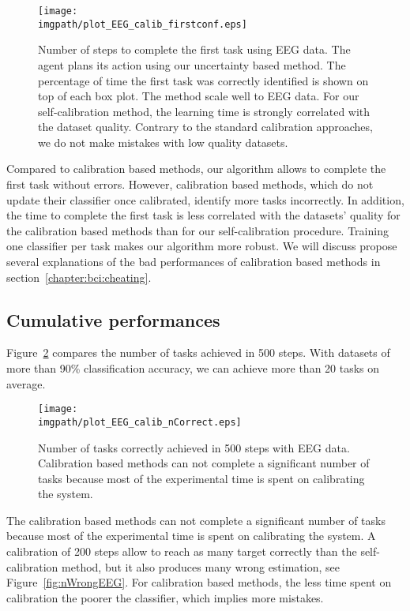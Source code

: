 \begin{figure}[!htbp]
\centering
\texttt{[image: \\imgpath/plot\_EEG\_calib\_firstconf.eps]}
\caption{Number of steps to complete the first task using EEG data. The agent plans its action using our uncertainty based method. The percentage of time the first task was correctly identified is shown on top of each box plot. The method scale well to EEG data. For our self-calibration method, the learning time is strongly correlated with the dataset quality. Contrary to the standard calibration approaches, we do not make mistakes with low quality datasets.}
\label{fig:firstEEG}
\end{figure}

Compared to calibration based methods, our algorithm allows to complete the first task without errors. However, calibration based methods, which do not update their classifier once calibrated, identify more tasks incorrectly. In addition, the time to complete the first task is less correlated with the datasets' quality for the calibration based methods than for our self-calibration procedure. Training one classifier per task makes our algorithm more robust. We will discuss propose several explanations of the bad performances of calibration based methods in section~\ref{chapter:bci:cheating}.

\subsection{Cumulative performances}

Figure~\ref{fig:nCorrectEEG} compares the number of tasks achieved in 500 steps. With datasets of more than 90\% classification accuracy, we can achieve more than 20 tasks on average. 


\begin{figure}[!htbp]
\centering
\texttt{[image: \\imgpath/plot\_EEG\_calib\_nCorrect.eps]}
\caption{Number of tasks correctly achieved in 500 steps with EEG data. Calibration based methods can not complete a significant number of tasks because most of the experimental time is spent on calibrating the system.}
\label{fig:nCorrectEEG}
\end{figure} 

The calibration based methods can not complete a significant number of tasks because most of the experimental time is spent on calibrating the system. A calibration of 200 steps allow to reach as many target correctly than the self-calibration method, but it also produces many wrong estimation, see Figure~\ref{fig:nWrongEEG}. For calibration based methods, the less time spent on calibration the poorer the classifier, which implies more mistakes.

